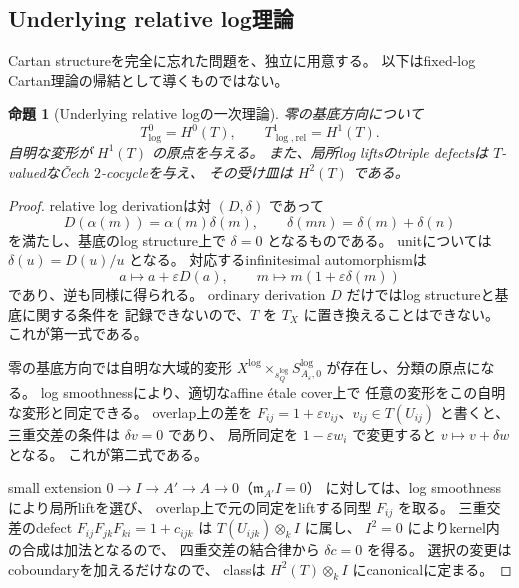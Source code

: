 \documentclass[uplatex,dvipdfmx,11pt]{jsarticle}
\numberwithin{equation}{section}
\theoremstyle{plain}
\newtheorem{proposition}[theorem]{命題}
\theoremstyle{definition}
\theoremstyle{remark}
\newcommand{\sQ}{s_Q^{\log}}
\newcommand{\Xlog}{X^{\log}}
\newcommand{\Aeps}{A_\varepsilon}
\begin{document}
\subsection{Underlying relative log理論}

Cartan structureを完全に忘れた問題を、独立に用意する。
以下はfixed-log Cartan理論の帰結として導くものではない。

\begin{proposition}[Underlying relative logの一次理論]
\label{prop:underlying-log}
零の基底方向について
\begin{equation}
\label{eq:underlying-classification}
T^0_{\log}=H^0(T),\qquad
T^1_{\log,\mathrm{rel}}=H^1(T).
\end{equation}
自明な変形が \(H^1(T)\) の原点を与える。
また、局所log liftsのtriple defectsは \(T\)-valuedなČech \(2\)-cocycleを与え、
その受け皿は \(H^2(T)\) である。
\end{proposition}

\begin{proof}
relative log derivationは対 \((D,\delta)\) であって
\[
D(\alpha(m))=\alpha(m)\delta(m),\qquad
\delta(mn)=\delta(m)+\delta(n)
\]
を満たし、基底のlog structure上で \(\delta=0\) となるものである。
unitについては \(\delta(u)=D(u)/u\) となる。
対応するinfinitesimal automorphismは
\[
a\longmapsto a+\varepsilon D(a),\qquad
m\longmapsto m(1+\varepsilon\delta(m))
\]
であり、逆も同様に得られる。
ordinary derivation \(D\) だけではlog structureと基底に関する条件を
記録できないので、\(T\) を \(T_X\) に置き換えることはできない。
これが第一式である。

零の基底方向では自明な大域的変形
\(\Xlog\times_{\sQ}S^{\log}_{\Aeps,0}\) が存在し、分類の原点になる。
log smoothnessにより、適切なaffine étale cover上で
任意の変形をこの自明な変形と同定できる。
overlap上の差を \(F_{ij}=1+\varepsilon v_{ij}\)、\(v_{ij}\in T(U_{ij})\) と書くと、
三重交差の条件は \(\delta v=0\) であり、
局所同定を \(1-\varepsilon w_i\) で変更すると \(v\mapsto v+\delta w\) となる。
これが第二式である。

small extension \(0\to I\to A'\to A\to0\)（\(\mathfrak m_{A'}I=0\)）
に対しては、log smoothnessにより局所liftを選び、
overlap上で元の同定をliftする同型 \(F_{ij}\) を取る。
三重交差のdefect
\(F_{ij}F_{jk}F_{ki}=1+c_{ijk}\) は \(T(U_{ijk})\otimes_kI\) に属し、
\(I^2=0\) によりkernel内の合成は加法となるので、
四重交差の結合律から \(\delta c=0\) を得る。
選択の変更はcoboundaryを加えるだけなので、
classは \(H^2(T)\otimes_kI\) にcanonicalに定まる。
\end{proof}
\end{document}
